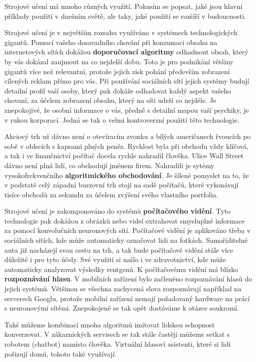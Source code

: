 \documentclass[a4paper,11pt, oneside]{book} \usepackage[czech]{babel}
\begin{document}
	Strojové učení má mnoho různých využití. Pokusím se popsat, jaké jsou hlavní příklady použití
	v dnešním světě, ale taky, jaké použití se rozšíří v budoucnosti.

	Strojové učení je v největším rozsahu využíváno v systémech technologických gigantů.
	Pomocí vašeho dosavadního chování při konzumaci obsahu na internetových
	sítích dokážou \textbf{doporučovací algoritmy} odhadnout obsah, který by vás dokázal
	zaujmout na co nejdelší dobu. Toto je pro podnikání většiny gigantů více než
	relevantní, protože jejich zisk pohání především zobrazení cílených reklam
	přímo pro vás. Při používání sociálních sítí jejich systémy budují detailní profil
	vaší osoby, který pak dokáže odhadovat každý aspekt vašeho chovaní, za účelem
	zobrazení obsahu, který na síti udrží co nejdéle.
	Je znepokojivé, že osobní informace o vás, předně s detailní mapou vaší psychiky, je
	v rukou korporací. Jedná se tak o velmi kontroverzní použití této technologie.

	Akciový trh už dávno není o otevíracím zvonku a bílých američanech řvoucích po sobě
	v oblecích s kapsami plných peněz. Rychlost byla při obchodu vždy klíčová, a tak i
	ve finančnictví počítač docela rychle nahradil člověka. Ulice Wall Street dávno není
	plná lidí, co obchodují jménem firem. Nahradili je sytémy vysokofrekvenčního
	\textbf{algoritmického obchodování}. Je šílené pomyslet na to, že v podstatě celý západní burzovní
	trh stojí na sadě počítačů, které vykonávají tisíce obchodů
	za sekundu za účelem zvýšení svého vlastního portfolia.

	Strojové učení je zakomponováno do systémů \textbf{počítačového vidění}. Tyto technologie
	pak dokážou z obrázků nebo videí extrahovat smysluplné
	informace za pomocí konvolučních neuronových sítí. Počítačové vidění je
	aplikováno třeba v sociálních sítích, kde může automaticky označovat lidi na fotkách.
	Samoříditelné auta již nacházejí svou cestu na trh, a tak bude počítačové vidění
	stále více důležité i pro tyto účely. Své využití si našlo i ve zdravotnictví,
	kde může automaticky analyzovat výsledky rentgenů.
	K počítačovému vidění má blízko \textbf{rozpoznávání hlasu}. V mobilních zařízení bylo začleněno
	rozpoznávání hlasů do jejich systémů. Většinou se všechna zachycená
	slova rozpoznávají například na serverech Googlu, protože mobilní zařízení
	nemají požadovaný hardware na prácí s neuronovými sítěmi. Znepokojeně se tak opět
	dostáváme k otázce soukromí.

	Také můžeme kombinací mnoha algoritmů imitovat lidskou schopnost konverzovat.
	V zákaznických servisech se tak stále častěji můžeme setkat s robotem (chatbot) namísto
	člověka. Virtuální hlasoví asistenti, které si lidi pořizují domů, tohoto také využívají.
\end{document}
